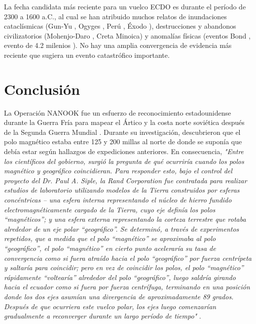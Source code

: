 \documentclass[10pt,twocolumn,letterpaper]{article}
\begin{document}
La fecha candidata más reciente para un vuelco ECDO es durante el período de 2300 a 1600 a.C., al cual se han atribuido muchos relatos de inundaciones cataclísmicas (Gun-Yu \cite{113,114,115}, Ogyges \cite{116,117}, Perú \cite{118,119}, Éxodo \cite{120}), destrucciones y abandonos civilizatorios (Mohenjo-Daro \cite{121}, Creta Minoica\cite{100,101}) y anomalías físicas (eventos Bond \cite{122}, evento de 4.2 milenios \cite{90}). No hay una amplia convergencia de evidencia más reciente que sugiera un evento catastrófico importante.

\section{Conclusión}

La Operación NANOOK fue un esfuerzo de reconocimiento estadounidense durante la Guerra Fría para mapear el Ártico y la costa norte soviética después de la Segunda Guerra Mundial \cite{137}. Durante su investigación, descubrieron que el polo magnético estaba entre 125 y 200 millas al norte de donde se suponía que debía estar según hallazgos de expediciones anteriores. En consecuencia, \textit{"Entre los científicos del gobierno, surgió la pregunta de qué ocurriría cuando los polos magnético y geográfico coincidieran. Para responder esto, bajo el control del proyecto del Dr. Paul A. Siple, la Rand Corporation fue contratada para realizar estudios de laboratorio utilizando modelos de la Tierra construidos por esferas concéntricas – una esfera interna representando el núcleo de hierro fundido electromagnéticamente cargado de la Tierra, cuyo eje definía los polos “magnéticos”; y una esfera externa representando la corteza terrestre que rotaba alrededor de un eje polar “geográfico”. Se determinó, a través de experimentos repetidos, que a medida que el polo “magnético” se aproximaba al polo “geográfico”, el polo “magnético” en cierto punto aceleraría su tasa de convergencia como si fuera atraído hacia el polo “geográfico” por fuerza centrípeta y saltaría para coincidir; pero en vez de coincidir los polos, el polo “magnético” rápidamente “voltearía” alrededor del polo “geográfico”, luego saldría girando hacia el ecuador como si fuera por fuerza centrífuga, terminando en una posición donde los dos ejes asumían una divergencia de aproximadamente 89 grados. Después de que ocurriera este vuelco polar, los ejes luego comenzarían gradualmente a reconverger durante un largo período de tiempo"} \cite{138,139}.
\end{document}
